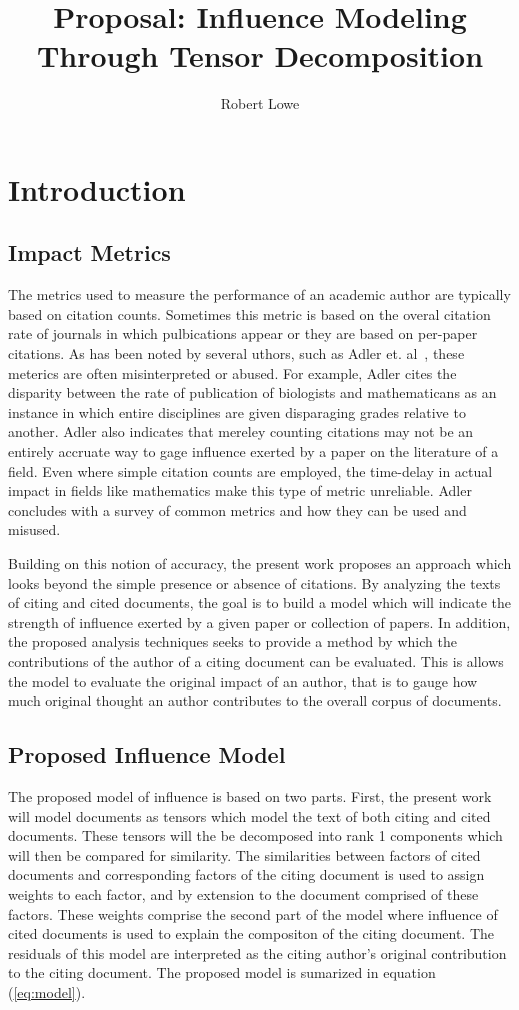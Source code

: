 \documentclass{article}
\title{Proposal: Influence Modeling Through Tensor Decomposition}
\author{Robert Lowe}
\begin{document}
\maketitle

\section{Introduction}
\subsection{Impact Metrics}
The metrics used to measure the performance of an academic author are
typically based on citation counts.  Sometimes this metric is based on
the overal citation rate of journals in which pulbications appear or
they are based on per-paper citations.  As has been noted by several
uthors, such as Adler et. al~\cite{adler2009}, these meterics are
often misinterpreted or abused.  For example, Adler cites the
disparity between the rate of publication of biologists and
mathematicans as an instance in which entire disciplines are given
disparaging grades relative to another. Adler also indicates that
mereley counting citations may not be an entirely accruate way to gage
influence exerted by a paper on the literature of a field.  Even where
simple citation counts are employed, the time-delay in actual impact
in fields like mathematics make this type of metric unreliable.  Adler
concludes with a survey of common metrics and how they can be used and
misused.

Building on this notion of accuracy, the present work proposes an
approach which looks beyond the simple presence or absence of
citations.  By analyzing the texts of citing and cited documents, the
goal is to build a model which will indicate the strength of influence
exerted by a given paper or collection of papers.  In addition, the
proposed analysis techniques seeks to provide a method by which the
contributions of the author of a citing document can be evaluated.
This is allows the model to evaluate the original impact of an author,
that is to gauge how much original thought an author contributes to
the overall corpus of documents. 

\subsection{Proposed Influence Model}
The proposed model of influence is based on two parts.  First, the
present work will model documents as tensors which model the text of
both citing and cited documents. These tensors will the be decomposed
into rank 1 components which will then be compared for similarity.
The similarities between factors of cited documents and corresponding
factors of the citing document is used to assign weights to each
factor, and by extension to the document comprised of these factors.
These weights comprise the second part of the model where influence of
cited documents is used to explain the compositon of the citing
document.  The residuals of this model are interpreted as the citing
author's original contribution to the citing document. The proposed
model is sumarized in equation (\ref{eq:model}). 
\end{document}
